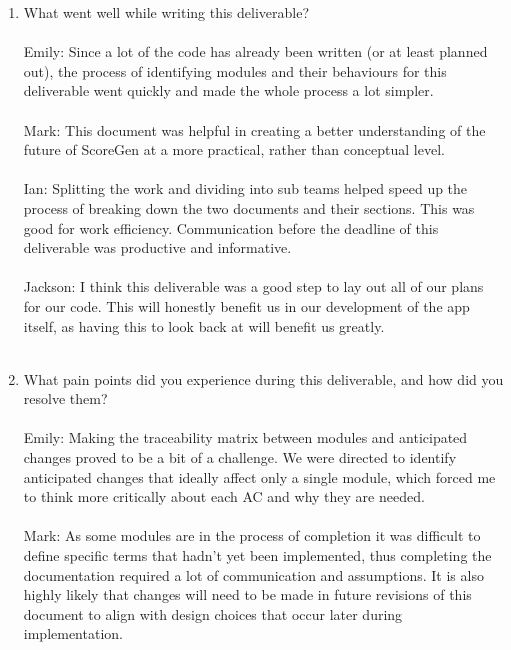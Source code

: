 \documentclass[12pt, titlepage]{article}
\begin{document}
\begin{enumerate}
  \item What went well while writing this deliverable?  \\ \\
  Emily: Since a lot of the code has already been written (or at least planned out), the process of identifying modules and their behaviours for this deliverable went quickly and made the whole process a lot simpler.\\ \\

  Mark: This document was helpful in creating a better understanding of the future of ScoreGen at a more practical, rather than conceptual level. \\ \\

  Ian: Splitting the work and dividing into sub teams helped speed up the process of breaking down the two documents and their sections. This was good for work efficiency. Communication before the deadline of this deliverable was productive and informative. \\ \\

  Jackson: I think this deliverable was a good step to lay out all of our plans for our code. This will honestly benefit us in our development of the app itself, as having this to look back at will benefit us greatly.  \\ \\
  
  \item What pain points did you experience during this deliverable, and how
    did you resolve them? \\ \\

    Emily: Making the traceability matrix between modules and anticipated changes proved to be a bit of a challenge. We were directed to identify anticipated changes that ideally affect only a single module, which forced me to think more critically about each AC and why they are needed. \\ \\

    Mark: As some modules are in the process of completion it was difficult to define specific terms that hadn’t yet been implemented, thus completing the documentation required a lot of communication and assumptions. It is also highly likely that changes will need to be made in future revisions of this document to align with design choices that occur later during implementation. \\ \\


\end{enumerate}
\end{document}
